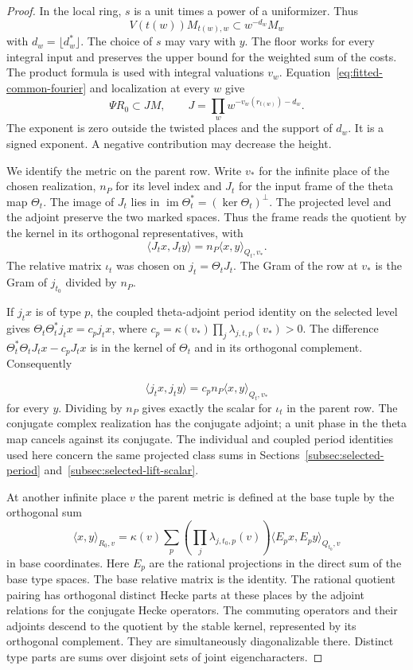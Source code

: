 \begin{proof}
In the local ring, \(s\) is a unit times a power of a
uniformizer. Thus 
\[
  V(t(w))M_{t(w),w}\subset w^{-d_w}M_w
\]
with \(d_w=\lfloor d_w^*\rfloor\). The choice of \(s\) may
vary with \(y\). The floor works for every integral input
and preserves the upper bound for the weighted sum of the
costs. The product formula is used with integral valuations
\(v_w\). Equation~\eqref{eq:fitted-common-fourier}
and localization at every \(w\) give
\[
 \Psi R_0\subset JM,\qquad
 J=\prod_w w^{-v_w(r_{t(w)})-d_w}.
\]
The exponent is zero outside the twisted places and the support
of \(d_w\). It is a signed exponent. A negative contribution
may decrease the height.

We identify the metric on the parent row. Write \(v_*\) for the
infinite place of the chosen realization, \(n_P\) for its level
index and \(J_t\) for the input frame of the theta map \(\Theta_t\).
The image of \(J_t\) lies in
\(\operatorname{im}\Theta_t^*=(\ker\Theta_t)^\perp\). The projected
level and the adjoint preserve the two marked spaces. Thus the
frame reads the quotient by the kernel in its orthogonal
representatives, with
\[
 \langle J_t x,J_t y\rangle=n_P\langle x,y\rangle_{Q_t,v_*}.
\]
The relative matrix \(\iota_t\) was chosen on
\(j_t=\Theta_t J_t\). The Gram of the row at \(v_*\) is the
Gram of \(j_{t_0}\) divided by \(n_P\).

If \(j_t x\) is of
type \(p\), the coupled theta-adjoint period identity on the
selected level gives
\(\Theta_t\Theta_t^*j_t x=c_p j_t x\), where
\(c_p=\kappa(v_*)\prod_j\lambda_{j,t,p}(v_*)>0\).
The difference \(\Theta_t^*\Theta_t J_t x-c_p J_t x\) is
in the kernel of \(\Theta_t\) and in its orthogonal complement.
Consequently

\[
  \langle j_t x,j_t y\rangle=c_p n_P\langle x,y\rangle_{Q_t,v_*}
\]
for every \(y\). Dividing by \(n_P\) gives exactly the scalar
for \(\iota_t\) in the parent row. The conjugate complex
realization has the conjugate adjoint; a unit phase in the
theta map cancels against its conjugate. The individual and
coupled period identities used here concern the same projected
class sums in Sections~\ref{subsec:selected-period}
and~\ref{subsec:selected-lift-scalar}.

At another infinite place \(v\) the parent metric is defined
at the base tuple by the orthogonal sum
\[
 \langle x,y\rangle_{R_0,v}=
 \kappa(v)\sum_p\left(\prod_j\lambda_{j,t_0,p}(v)\right)
       \langle E_p x,E_p y\rangle_{Q_{t_0},v}
\]
in base coordinates. Here \(E_p\) are the rational projections
in the direct sum of the base type spaces. The base relative
matrix is the identity. The rational quotient pairing has
orthogonal distinct Hecke parts at these places by the adjoint
relations for the conjugate Hecke operators. The commuting
operators and their adjoints descend to the quotient by the
stable kernel, represented by its orthogonal complement. They
are simultaneously diagonalizable there. Distinct type parts
are sums over disjoint sets of joint eigencharacters.


\end{proof}

